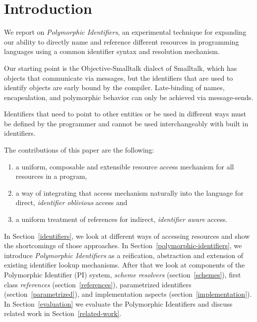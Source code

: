 \documentclass[preprint,authoryear]{llncs}
\begin{document}


\section{Introduction}

We report on \emph{Polymorphic Identifiers}, an experimental
technique for expanding our ability to directly name and reference different 
resources
in programming languages using a common identifier syntax and resolution
mechanism.



Our starting point is the Objective-Smalltalk \cite{objst} dialect of Smalltalk, which has objects
that communicate via messages\cite{Goldberg1983}, but the identifiers that are used to identify 
objects are early bound by the compiler.  Late-binding of names, encapsulation,
and polymorphic behavior can only be achieved via message-sends.


Identifiers that need to point to other entities or be used in different ways must be defined
by the programmer and cannot be used interchangeably with built in identifiers.  

The contributions of this paper are the following:
\begin{enumerate} 

\item a uniform, composable and extensible resource access mechanism for all
resources in a program, 
\item  a way of integrating that access mechanism naturally into the language for
direct, \emph{identifier oblivious} access and
\item a uniform treatment of references for indirect, \emph{identifier aware} access.
\end{enumerate}



In Section~\ref{identifiers}, we  look at different ways of accessing resources and show
the shortcomings of those approaches.  In Section~\ref{polymorphic-identifiers}, we 
introduce \emph{Polymorphic Identifiers} as a reification, abstraction and extension of existing 
identifier lookup mechanisms.  After that we look at components of the Polymorphic Identifier (PI)
system, \emph{scheme resolvers} (section~\ref{schemes}), first class \emph{references} (section~\ref{references}),
parametrized identifiers (section~\ref{parametrized}), and  implementation aspects (section~\ref{implementation}).
In Section~\ref{evaluation} we evaluate the Polymorphic Identifiers and discuss related work in Section~\ref{related-work}.
\end{document}
